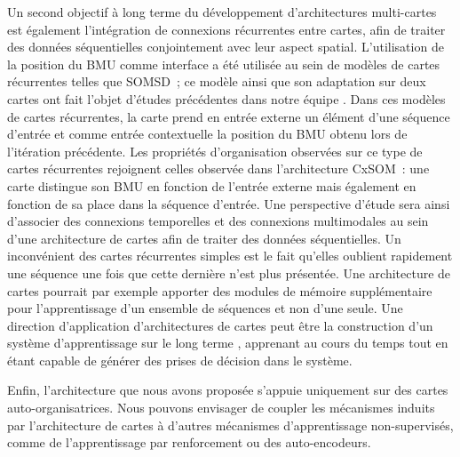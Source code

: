 Un second objectif à long terme du développement d'architectures multi-cartes est également l'intégration de connexions récurrentes entre cartes, afin de traiter des données séquentielles conjointement avec leur aspect spatial. 
L'utilisation de la position du BMU comme interface a été utilisée au sein de modèles de cartes récurrentes telles que SOMSD~; ce modèle ainsi que son adaptation sur deux cartes ont fait l'objet d'études précédentes dans notre équipe \cite{baheux_towards_2014, fix20}. 
Dans ces modèles de cartes récurrentes, la carte prend en entrée externe un élément d'une séquence d'entrée et comme entrée contextuelle la position du BMU obtenu lors de l'itération précédente.
Les propriétés d'organisation observées sur ce type de cartes récurrentes rejoignent celles observée dans l'architecture CxSOM~: une carte distingue son BMU en fonction de l'entrée externe mais également en fonction de sa place dans la séquence d'entrée.
Une perspective d'étude sera ainsi d'associer des connexions temporelles et des connexions multimodales au sein d'une architecture de cartes afin de traiter des données séquentielles.
Un inconvénient des cartes récurrentes simples est le fait qu'elles oublient rapidement une séquence une fois que cette dernière n'est plus présentée. 
Une architecture de cartes pourrait par exemple apporter des modules de mémoire supplémentaire pour l'apprentissage d'un ensemble de séquences et non d'une seule.
Une direction d'application d'architectures de cartes peut être la construction d'un système d'apprentissage \og sur le long terme \fg{}, apprenant au cours du temps tout en étant capable de générer des prises de décision dans le système.


Enfin, l'architecture que nous avons proposée s'appuie uniquement sur des cartes auto-organisatrices. Nous pouvons envisager de coupler les mécanismes induits par l'architecture de cartes à d'autres mécanismes d'apprentissage non-supervisés, comme de l'apprentissage par renforcement ou des auto-encodeurs.



